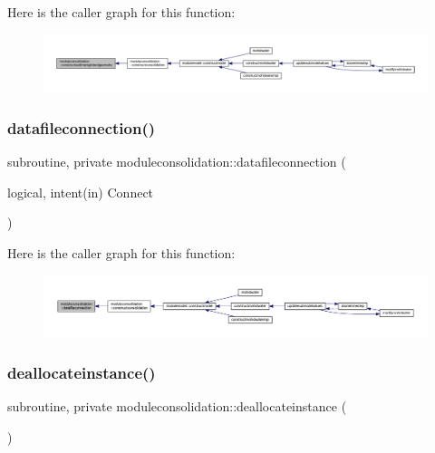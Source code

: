 Here is the caller graph for this function\+:\nopagebreak
\begin{figure}[H]
\begin{center}
\leavevmode
\includegraphics[width=350pt]{namespacemoduleconsolidation_a7fa231a9af605419b5dbc619d4e2a60f_icgraph}
\end{center}
\end{figure}
\mbox{\label{namespacemoduleconsolidation_a59eaaf93a76021e109b8d97e2756ac51}} 
\subsubsection{\texorpdfstring{datafileconnection()}{datafileconnection()}}
{\footnotesize\ttfamily subroutine, private moduleconsolidation\+::datafileconnection (\begin{DoxyParamCaption}\item[{logical, intent(in)}]{Connect }\end{DoxyParamCaption})\hspace{0.3cm}{\ttfamily [private]}}

Here is the caller graph for this function\+:\nopagebreak
\begin{figure}[H]
\begin{center}
\leavevmode
\includegraphics[width=350pt]{namespacemoduleconsolidation_a59eaaf93a76021e109b8d97e2756ac51_icgraph}
\end{center}
\end{figure}
\mbox{\label{namespacemoduleconsolidation_ac59ee6a9bf70ef4f2f509cc55bb5b242}} 
\subsubsection{\texorpdfstring{deallocateinstance()}{deallocateinstance()}}
{\footnotesize\ttfamily subroutine, private moduleconsolidation\+::deallocateinstance (\begin{DoxyParamCaption}{ }\end{DoxyParamCaption})\hspace{0.3cm}{\ttfamily [private]}}

